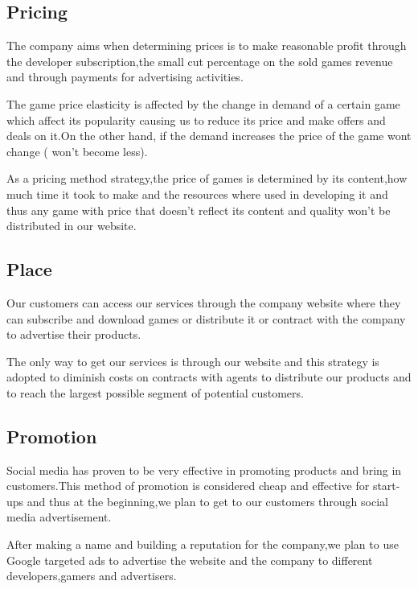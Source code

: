 \documentclass[fontsize=14pt,svgnames]{scrreprt}
\begin{document}
\subsection{Pricing}
The company aims when determining prices is to make reasonable profit through the developer subscription,the small cut percentage on the sold games revenue and through payments for advertising activities. 
\par The game price elasticity is affected by the change in demand of a certain game which affect its popularity causing us to reduce its price and  make offers and deals on it.On the other hand, if the demand increases the price of the game wont change ( won't become less).
\par As a pricing method strategy,the price of games is determined by its content,how much time it took to make and the resources where used in developing it and thus any game with price that doesn't reflect its content and quality won't be distributed in our website.
\subsection{Place}
Our customers can access our services through the company website where they can subscribe and download games or distribute it or contract with the company to advertise their products.
\par The only way to get our services is through our website and this strategy is adopted to diminish costs on contracts with agents to distribute our products and to reach the largest possible segment of potential customers.
\subsection{Promotion} 
Social media has proven to be very effective in promoting products and bring in customers.This method of promotion is considered cheap and effective for start-ups and thus at the beginning,we plan to get to our customers through social media advertisement.
\par After making a name and building a reputation for the company,we plan to use Google targeted ads to advertise the website and the company to different developers,gamers and advertisers.
\end{document}
